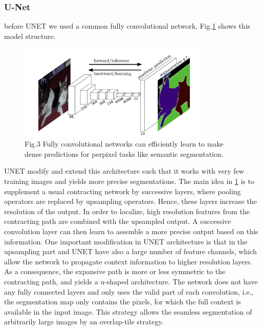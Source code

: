 \documentclass[12pt]{article}
\begin{document}
	\subsubsection{U-Net}
	before UNET we used a common fully convolutional network, Fig.\ref{fig:beforeUNET} shows this model structure.
	
\begin{center}
\begin{figure}[H]
\centering
\includegraphics[width=0.8\textwidth]{Figs/beforeUNET}
\caption{Fig.3  Fully convolutional networks can efficiently learn to make dense predictions for perpixel tasks like semantic segmentation.}
\label{fig:beforeUNET}
\end{figure}
\end{center}
	
	UNET modify and extend this architecture such that it works with very few training images and yields more precise segmentations. The main idea in \ref{fig:beforeUNET} is to supplement a usual contracting network by successive layers, where pooling operators are replaced by upsampling operators. Hence, these layers increase the resolution of the output. In order to localize, high
resolution features from the contracting path are combined with the upsampled output. A successive convolution layer can then learn to assemble a more precise output based on this information. One important modification in UNET architecture is that in the upsampling
part and UNET have also a large number of feature channels, which allow the network
to propagate context information to higher resolution layers. As a consequence,
the expansive path is more or less symmetric to the contracting path, and yields
a u-shaped architecture. The network does not have any fully connected layers
and only uses the valid part of each convolution, i.e., the segmentation map only
contains the pixels, for which the full context is available in the input image.
This strategy allows the seamless segmentation of arbitrarily large images by an
overlap-tile strategy.
	
\end{document}
